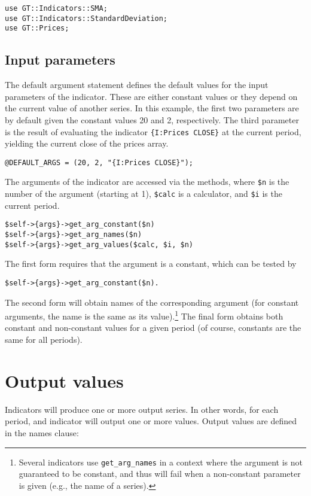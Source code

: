 \documentclass[11pt,twoside]{article}
\begin{document}
\begin{lstlisting}[name=example]
use GT::Indicators::SMA;
use GT::Indicators::StandardDeviation;
use GT::Prices;
\end{lstlisting}

\subsection{Input parameters}
The default argument statement defines the default values for the input
parameters of the indicator. These are either constant values or they
depend on the current value of another series. In this example, the
first two parameters are by default given the constant values 20 and 2,
respectively. The third parameter is the result of evaluating the
indicator \lstinline!{I:Prices CLOSE}! at the current period,
yielding the current close of the prices array. 
\begin{lstlisting}[name=example]
@DEFAULT_ARGS = (20, 2, "{I:Prices CLOSE}");
\end{lstlisting}
The arguments of the indicator are accessed via the methods, where
\lstinline!$n! is the number of the argument (starting at 1),
\lstinline!$calc! is a calculator, and \lstinline!$i!
is the current period.
\begin{lstlisting}[numbers=none]
$self->{args}->get_arg_constant($n)
$self->{args}->get_arg_names($n)
$self->{args}->get_arg_values($calc, $i, $n)
\end{lstlisting}

The first form requires that the argument is a constant, which can be
tested by
\begin{lstlisting}[numbers=none]
$self->{args}->get_arg_constant($n).
\end{lstlisting}
The second form will obtain names of the corresponding argument (for
constant arguments, the name is the same as its
value).\footnote{Several indicators use
\lstinline!get_arg_names! in a context where the argument is
not guaranteed to be constant, and thus will fail when a non-constant
parameter is given (e.g., the name of a series).} The final form
obtains both constant and non-constant values for a given period (of
course, constants are the same for all periods).

\section[Output values]{\label{bkm:Ref192524690}Output values}
Indicators will produce one or more output series. In other words, for
each period, and indicator will output one or more values. Output
values are defined in the names clause:
\end{document}
